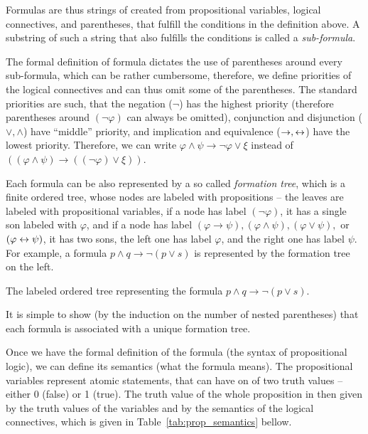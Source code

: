 Formulas are thus strings of created from propositional variables, logical connectives, and parentheses, that fulfill the conditions in the definition above. A substring of such a string that also fulfills the conditions is called a \emph{sub-formula}. 

The formal definition of formula dictates the use of parentheses around every sub-formula, which can be rather cumbersome, therefore, we define priorities of the logical connectives and can thus omit some of the parentheses. The standard priorities are such, that the negation ($\neg$) has the highest priority (therefore parentheses around $(\neg \varphi)$ can always be omitted), conjunction and disjunction ($\lor, \land$) have ``middle'' priority, and implication and equivalence ($\to, \leftrightarrow$) have the lowest priority. Therefore, we can write $\varphi \land \psi \to \neg \varphi \lor \xi$ instead of $((\varphi \land \psi) \to ((\neg \varphi) \lor \xi))$. 

Each formula can be also represented by a so called \emph{formation tree}, which is a finite ordered tree, whose nodes are labeled with propositions -- the leaves are labeled with propositional variables, if a node has label $(\neg \varphi)$, it has a single son labeled with $\varphi$, and if a node has label $(\varphi \to \psi), (\varphi \land \psi), (\varphi \lor \psi),$ or $(\varphi \leftrightarrow \psi)$, it has two sons, the left one has label $\varphi$, and the right one has label $\psi$. For example, a formula $p \land q \to \neg (p \lor s)$ is represented by the formation tree on the left.
\begin{marginfigure}[-4\baselineskip]
\centering
{}
\caption{The labeled ordered tree representing the formula $p \land q \to \neg (p \lor s)$.}
\end{marginfigure}

It is simple to show (by the induction on the number of nested parentheses) that each formula is associated with a unique formation tree. 

Once we have the formal definition of the formula (the syntax of propositional logic), we can define its semantics (what the formula means). The propositional variables represent atomic statements, that can have on of two truth values -- either 0 (false) or 1 (true). The truth value of the whole proposition in then given by the truth values of the variables and by the semantics of the logical connectives, which is given in Table~\ref{tab:prop_semantics} bellow.

